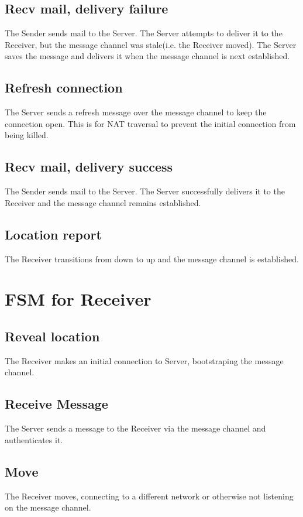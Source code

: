 \documentclass[11pt]{article}
\begin{document}
\subsection*{Recv mail, delivery failure}
The Sender sends mail to the Server. The Server attempts to deliver it to the
Receiver, but the message channel was stale(i.e. the Receiver moved). The
Server saves the message and delivers it when the message channel is next
established.
\subsection*{Refresh connection}
The Server sends a refresh message over the message channel to keep the
connection open. This is for NAT traversal to prevent the initial connection
from being killed.
\subsection*{Recv mail, delivery success}
The Sender sends mail to the Server. The Server successfully delivers it to the
Receiver and the message channel remains established.
\subsection*{Location report}
The Receiver transitions from down to up and the message channel is
established.

\pagebreak

\section*{FSM for Receiver}

\subsection*{Reveal location}
The Receiver makes an initial connection to Server, bootstraping the message
channel.
\subsection*{Receive Message}
The Server sends a message to the Receiver via the message channel and authenticates
it.
\subsection*{Move}
The Receiver moves, connecting to a different network or otherwise not
listening on the message channel.
\end{document}
